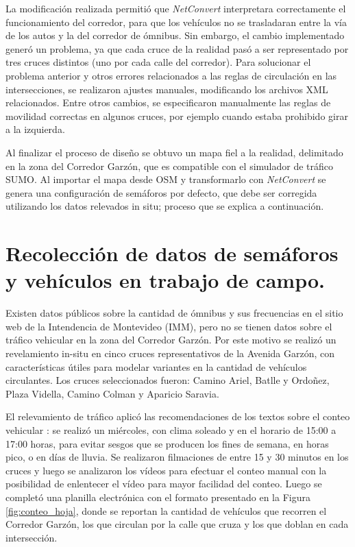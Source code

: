 La modificación realizada permitió que \emph{NetConvert} interpretara correctamente el funcionamiento del corredor, para que los vehículos no se trasladaran entre la vía de los autos y la del corredor de ómnibus. Sin embargo, el cambio implementado generó un problema, ya que cada cruce de la realidad pasó a ser representado por tres cruces distintos (uno por cada calle del corredor). Para solucionar el problema anterior y otros errores relacionados a las reglas de circulación en las intersecciones, se realizaron ajustes manuales, modificando los archivos XML relacionados. Entre otros cambios, se especificaron manualmente las reglas de movilidad correctas en algunos cruces, por ejemplo cuando estaba prohibido girar a la izquierda.

Al finalizar el proceso de diseño se obtuvo un mapa fiel a la realidad, delimitado en la zona del Corredor Garzón, que es compatible con el simulador de tráfico SUMO. Al importar el mapa desde OSM y transformarlo con \emph{NetConvert} se genera una configuración de semáforos por defecto, que debe ser corregida utilizando los datos relevados in situ; proceso que se explica a continuación.


\section{Recolección de datos de semáforos y vehículos en trabajo de campo.}

Existen datos públicos sobre la cantidad de ómnibus y sus frecuencias en el sitio web de la Intendencia de Montevideo (IMM), pero no se tienen datos sobre el tráfico vehicular en la zona del Corredor Garzón. Por este motivo se realizó un revelamiento in-situ en cinco cruces representativos de la Avenida Garzón, con características útiles para modelar variantes en la cantidad de vehículos circulantes. 
Los cruces seleccionados fueron: Camino Ariel, Batlle y Ordoñez, Plaza Vidella, Camino Colman y Aparicio Saravia. 

El relevamiento de tráfico aplicó las recomendaciones de los textos sobre el conteo vehicular \cite{ConteoTrafico}: se realizó un miércoles, con clima soleado y en el horario de 15:00 a 17:00 horas, para evitar sesgos que se producen los fines de semana, en horas pico, o en días de lluvia. Se realizaron filmaciones de entre 15 y 30 minutos en los cruces y luego se analizaron los vídeos para efectuar el conteo manual con la posibilidad de enlentecer el vídeo para mayor facilidad del conteo. Luego se completó una planilla electrónica con el formato presentado en la Figura \ref{fig:conteo_hoja}, donde se reportan la cantidad de vehículos que recorren el Corredor Garzón, los que circulan por la calle que cruza y los que doblan en cada intersección. 

